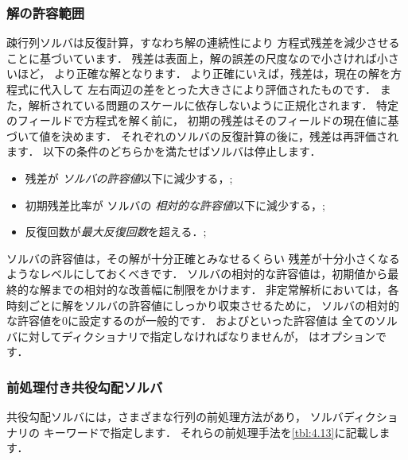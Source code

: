 \subsubsection{解の許容範囲}
\label{sssec:4.5.1.1}
疎行列ソルバは反復計算，すなわち解の連続性により
方程式残差を減少させることに基づいています．
残差は表面上，解の誤差の尺度なので小さければ小さいほど，
より正確な解となります．
より正確にいえば，残差は，現在の解を方程式に代入して
左右両辺の差をとった大きさにより評価されたものです．
また，解析されている問題のスケールに依存しないように正規化されます．
特定のフィールドで方程式を解く前に，
初期の残差はそのフィールドの現在値に基づいて値を決めます．
それぞれのソルバの反復計算の後に，残差は再評価されます．
以下の条件のどちらかを満たせばソルバは停止します．
\begin{itemize}
 \item 残差が
%
%
       \emph{ソルバの許容値}以下に減少する，;
 \item 初期残差比率が
%
%
       ソルバの
%
       \emph{相対的な許容値}以下に減少する，;
 \item 反復回数が\emph{最大反復回数}を超える．;
%
%
\end{itemize}
ソルバの許容値は，その解が十分正確とみなせるくらい
残差が十分小さくなるようなレベルにしておくべきです．
ソルバの相対的な許容値は，初期値から最終的な解までの相対的な改善幅に制限をかけます．
非定常解析においては，各時刻ごとに解をソルバの許容値にしっかり収束させるために，
ソルバの相対的な許容値を$0$に設定するのが一般的です．
およびといった許容値は
全てのソルバに対してディクショナリで指定しなければなりませんが，
はオプションです．


\subsubsection{前処理付き共役勾配ソルバ}
\label{sssec:4.5.1.2}
共役勾配ソルバには，さまざまな行列の前処理方法があり，
ソルバディクショナリの
%
%
キーワードで指定します．
それらの前処理手法を\autoref{tbl:4.13}に記載します．


